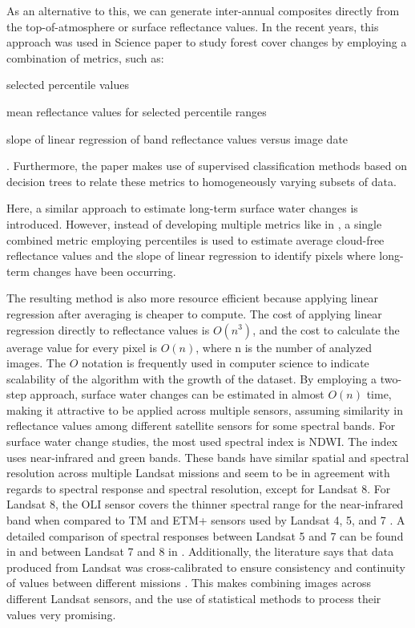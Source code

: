 As an alternative to this, we can generate inter-annual composites directly from the top-of-atmosphere or surface reflectance values. In the recent years, this approach was used in Science paper \citet{Hansen2013} to study forest cover changes by employing a combination of metrics, such as: 
\begin{enumerate*}[label=(\emph{\alph*})]
	\item selected percentile values
	\item mean reflectance values for selected percentile ranges
	\item slope of linear regression of band reflectance values versus image date
\end{enumerate*}. Furthermore, the paper makes use of supervised classification methods based on decision trees to relate these metrics to homogeneously varying subsets of data.

Here, a similar approach to estimate long-term surface water changes is introduced. However, instead of developing multiple metrics like in \citet{Hansen2013}, a single combined metric employing percentiles is used to estimate average cloud-free reflectance values and the slope of linear regression to identify pixels where long-term changes have been occurring. 

The resulting method is also more resource efficient because applying linear regression after averaging is cheaper to compute. The cost of applying linear regression directly to reflectance values is $O(n^3)$, and the cost to calculate the average value for every pixel is $O(n)$, where n is the number of analyzed images. The $O$ notation is frequently used in computer science to indicate scalability of the algorithm with the growth of the dataset. By employing a two-step approach, surface water changes can be estimated in almost $O(n)$ time, making it attractive to be applied across multiple sensors, assuming similarity in reflectance values among different satellite sensors for some spectral bands. For surface water change studies, the most used spectral index is NDWI. The index uses near-infrared and green bands. These bands have similar spatial and spectral resolution across multiple Landsat missions and seem to be in agreement with regards to spectral response and spectral resolution, except for Landsat 8. For Landsat 8, the OLI sensor covers the thinner spectral range for the near-infrared band when compared to TM and ETM+ sensors used by Landsat 4, 5, and 7 \citet{roy2016characterization, angal2014cross}. A detailed comparison of spectral responses between Landsat 5 and 7 can be found in \citet{teillet2001radiometric} and between Landsat 7 and 8 in \citet{flood2014continuity}. Additionally, the literature says that data produced from Landsat was cross-calibrated to ensure consistency and continuity of values between different missions \citet{mishra2014radiometric}. This makes combining images across different Landsat sensors, and the use of statistical methods to process their values very promising.

